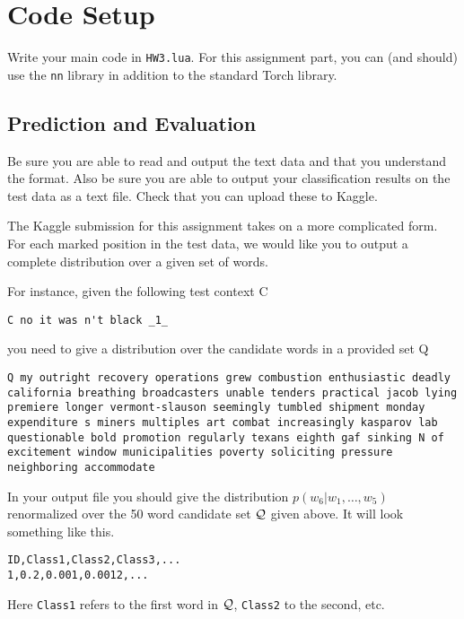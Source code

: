 \documentclass[11pt]{article}
\begin{document}
\section{Code Setup}

Write your main code in \texttt{HW3.lua}. For this assignment part,
you can (and should) use the \texttt{nn} library in addition to the
standard Torch library. 

\subsection{Prediction and Evaluation}

Be sure you are able to read and output the text data and that you
understand the format.  Also be sure you are able to output your
classification results on the test data as a text file. Check that you
can upload these to Kaggle. 

The Kaggle submission for this assignment takes on a more complicated form. 
For each marked position in the test data, we would like you to output a complete 
distribution over a given set of words.


For instance, given the following test context C 

\begin{lstlisting}
C no it was n't black _1_
\end{lstlisting}

you need to give a distribution over the candidate words in a provided set Q

\begin{lstlisting}
Q my outright recovery operations grew combustion enthusiastic deadly california breathing broadcasters unable tenders practical jacob lying premiere longer vermont-slauson seemingly tumbled shipment monday expenditure s miners multiples art combat increasingly kasparov lab questionable bold promotion regularly texans eighth gaf sinking N of excitement window municipalities poverty soliciting pressure neighboring accommodate
\end{lstlisting}

In your output file you should give the distribution $p(w_6 | w_1, \ldots, w_5)$ renormalized
over the 50 word candidate set $\mathcal{Q}$ given above. It will look something like this.

\begin{verbatim}
ID,Class1,Class2,Class3,...
1,0.2,0.001,0.0012,...
\end{verbatim}

\noindent Here \texttt{Class1} refers to the first word in $\mathcal{Q}$, \texttt{Class2} to the second, etc.
\end{document}
